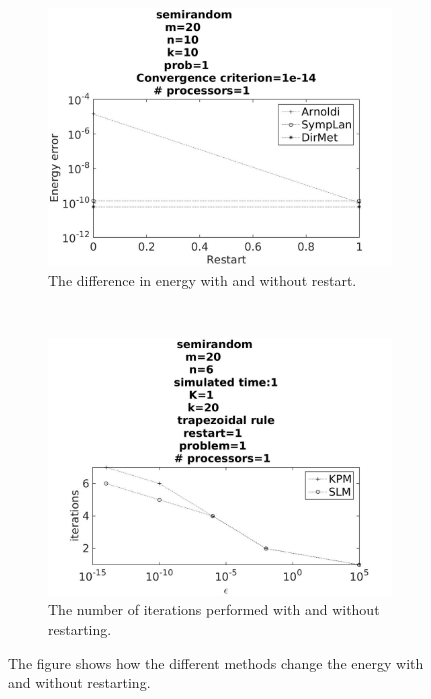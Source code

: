 \begin{figure}[H]
        \centering
        \begin{subfigure}[b]{0.45\textwidth}
                \includegraphics[width=\textwidth]{../MATLAB/fig/compareEnergy.jpg}
                \caption{ The difference in energy with and without restart. }
                \label{fig:intconvtrap}
        \end{subfigure}
        ~
        \begin{subfigure}[b]{0.45\textwidth}
                \includegraphics[width=\textwidth]{../MATLAB/fig/compareIter.jpg}
                \caption{ The number of iterations performed with and without restarting.  }
                \label{fig:intconveul}
        \end{subfigure}
        \caption{ The figure shows how the different methods change the energy with and without restarting.  }
        \label{fig:intconv}
\end{figure}

